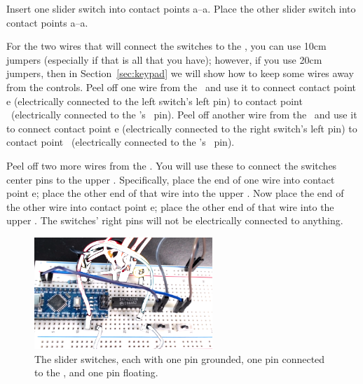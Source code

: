 Insert one slider switch into contact points a--a. %
Place the other slider switch  into contact points a--a. %

For the two wires that will connect the switches to the \developmentboard, you can use 10cm jumpers (especially if that is all that you have);
however, if you use 20cm jumpers, then in Section~\ref{sec:keypad} we will show how to keep some wires away from the controls.
Peel off one wire from the \rainbow\ and use it to connect contact point e (electrically connected to the left switch's left pin) to contact point \mculeftswitchpoint\ (electrically connected to the \developmentboard's \mculeftswitch\ pin).
Peel off another wire from the \rainbow\ and use it to connect contact point e (electrically connected to the right switch's left pin) to contact point \mcurightswitchpoint\ (electrically connected to the \developmentboard's \mcurightswitch\ pin).

Peel off two more wires from the \rainbow.
You will use these to connect the switches center pins %
to the upper \ground.
Specifically, place the end of one wire into contact point e; %
place the other end of that wire into the upper \ground.
Now place the end of the other wire into contact point e; %
place the other end of that wire into the upper \ground.
The switches' right pins will not be electrically connected to anything.


\begin{figure}
    \centering
    \includegraphics[width=0.6\textwidth]{direct/switches/switch-spdt-i2c}
    \caption{The slider switches, each with one pin grounded, one pin connected to the \developmentboard, and one pin floating.
        \label{fig:switch-spdt}}
\end{figure}

